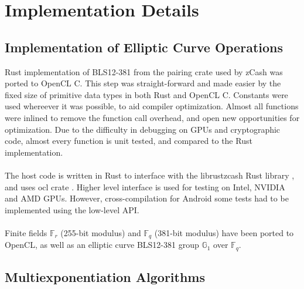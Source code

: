 \chapter{Implementation Details} %

\label{Chapter5} %


\section{Implementation of Elliptic Curve Operations}


Rust implementation of BLS12-381 from the pairing crate\cite{githubpairing} used by zCash was ported to OpenCL C. This step was straight-forward and made easier by the fixed size of primitive data types in both Rust and OpenCL C. Constants were used whereever it was possible, to aid compiler optimization. Almost all functions were inlined to remove the function call overhead, and open new opportunities for optimization. Due to the difficulty in debugging on GPUs and cryptographic code, almost every function is unit tested, and compared to the Rust implementation.\\
\\
The host code is written in Rust to interface with the librustzcash Rust library \cite{githublibrustzcash}, and uses ocl crate \cite{githubocl}. Higher level interface is used for testing on Intel, NVIDIA and AMD GPUs. However, cross-compilation for Android some tests had to be implemented using the low-level API.\\
\\
Finite fields $\mathbb{F}_r$ (255-bit modulus) and $\mathbb{F}_q$ (381-bit modulus) have been ported to OpenCL, as well as an elliptic curve BLS12-381 group $\mathbb{G}_1$ over $\mathbb{F}_q$.

\section{Multiexponentiation Algorithms}

